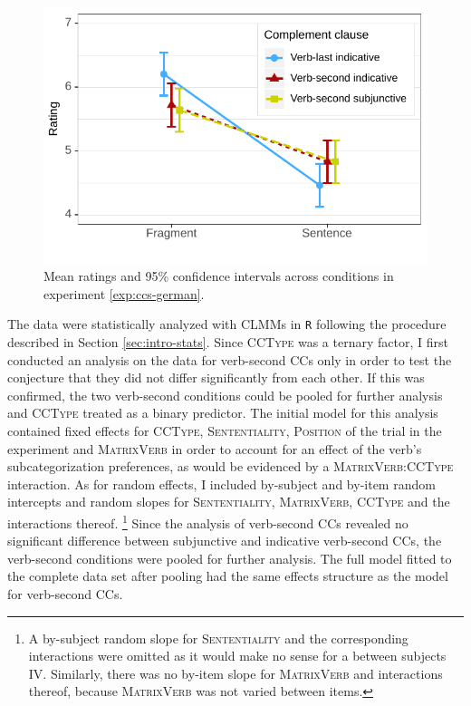 \begin{figure}[t]
\includegraphics[scale=1]{figures/ex2b_ccs_de_lc_estimates}
 \caption{Mean ratings and 95\% confidence intervals across conditions in experiment \ref{exp:ccs-german}. \label{fig:ccs-german-estimates}}
\end{figure}
%
The data were statistically analyzed with CLMMs in \texttt{R} following the procedure described in Section \ref{sec:intro-stats}. Since \textsc{CCType} was a ternary factor, I first conducted an analysis on the data for verb-second CCs only in order to test the conjecture that they did not differ significantly from each other. If this was confirmed, the two verb-second conditions could be pooled for further analysis and \textsc{CCType} treated as a binary predictor. The initial model for this analysis contained fixed effects for \textsc{CCType}, \textsc{Sententiality}, \textsc{Position} of the trial in the experiment and \textsc{MatrixVerb} in order to account for an effect of the verb's subcategorization preferences, as would be evidenced by a \textsc{MatrixVerb:CCType} interaction. As for random effects, I included by-subject and by-item random intercepts and random slopes for \textsc{Sententiality}, \textsc{MatrixVerb}, \textsc{CCType} and the interactions thereof.%
% 
\footnote{A by-subject random slope for \textsc{Sententiality} and the corresponding interactions were omitted as it would make no sense for a between subjects IV. Similarly, there was no by-item slope for \textsc{MatrixVerb} and interactions thereof, because \textsc{MatrixVerb} was not varied between items.}\afterfn%
%
Since the analysis of verb-second CCs revealed no significant difference between subjunctive and indicative  verb-second CCs, the verb-second conditions were pooled for further analysis. The full model fitted to the complete data set after pooling had the same effects structure as the model for verb-second CCs.

